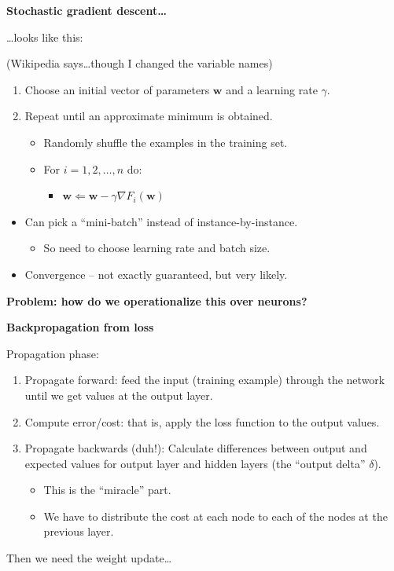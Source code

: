 \documentclass{beamer}
\newcommand{\placard}[1]{
  \begin{frame}
    \begin{center}
      \huge
      \textbf{#1}
    \end{center}
  \end{frame}
}
\newcommand{\pagestepalt}[2]{
  \begin{frame}[t]
    \begin{minipage}[t][0.26\textheight][t]{\textwidth}
      \begin{center}
        \huge
        \textbf{#1}
      \end{center}
    \end{minipage}
    
    \begin{minipage}[t][0.7\textheight][c]{\textwidth}
      #2
    \end{minipage}
  \end{frame}
}
\begin{document}
\pagestepalt{Stochastic gradient descent\ldots}{
  \ldots looks like this:
  \begin{block}{(Wikipedia says\ldots though I changed the variable names)}
    \begin{enumerate}
    \item Choose an initial vector of parameters $\mathbf{w}$ and a learning rate $\gamma$.
    \item Repeat until an approximate minimum is obtained.
      \begin{itemize}
      \item Randomly shuffle the examples in the training set.
      \item For $i = 1,2,\ldots,n$ do:
        \begin{itemize}
          \item $\mathbf{w} \Leftarrow \mathbf{w} - \gamma\nabla F_i(\mathbf{w})$
        \end{itemize}
      \end{itemize}
    \end{enumerate}
  \end{block}
  \begin{itemize}
  \item Can pick a ``mini-batch'' instead of instance-by-instance.
    \begin{itemize}
    \item So need to choose learning rate and batch size.
    \end{itemize}
  \item Convergence -- not exactly guaranteed, but very likely.
  \end{itemize}
}

\placard{Problem: how do we operationalize this over neurons?}

\pagestepalt{Backpropagation from loss}{
  Propagation phase:\pause
  \begin{enumerate}
  \item \alert{Propagate forward}: feed the input (training
    example) through the network until we get values at the output layer.\pause
  \item \alert{Compute error/cost}: that is, apply the loss function to the output values.\pause
  \item \alert{Propagate backwards} (duh!): Calculate differences between output and expected values
    for output layer and hidden layers (the ``output delta'' $\delta$).\pause
    \begin{itemize}
    \item This is the ``miracle'' part.
    \item We have to distribute the cost at each node to each of the nodes at the previous layer.
    \end{itemize}
  \end{enumerate}
  Then we need the weight update\ldots
}
\end{document}
